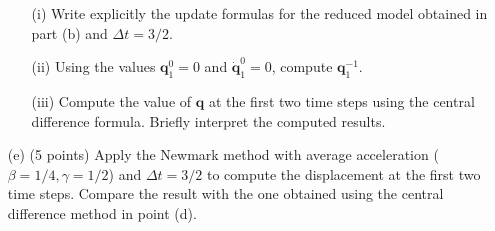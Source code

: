 \documentclass[12pt]{article}
\begin{document}
\begin{itemize}
\[	      \]
	      \begin{itemize}
		      \item[(i)] Write explicitly the update formulas for the reduced model obtained in part (b) and $\Delta t=3/2$.
		      \item[(ii)] Using the values \( \mathbf q_1^0 = 0 \) and \( \dot{\mathbf q}_1^0 = 0 \), compute \( \mathbf q_1^{-1} \).
		      \item[(iii)] Compute the value of \(\mathbf q \) at the first two time steps using the central difference formula. Briefly interpret the computed results.
	      \end{itemize}

	\item[(e)] (5 points) Apply the Newmark method with average acceleration (\( \beta = 1/4, \gamma = 1/2 \)) and $\Delta t=3/2$ to compute the displacement at the first two time steps. Compare the result with the one obtained using the central difference method in point (d).
\end{itemize}
\end{document}
